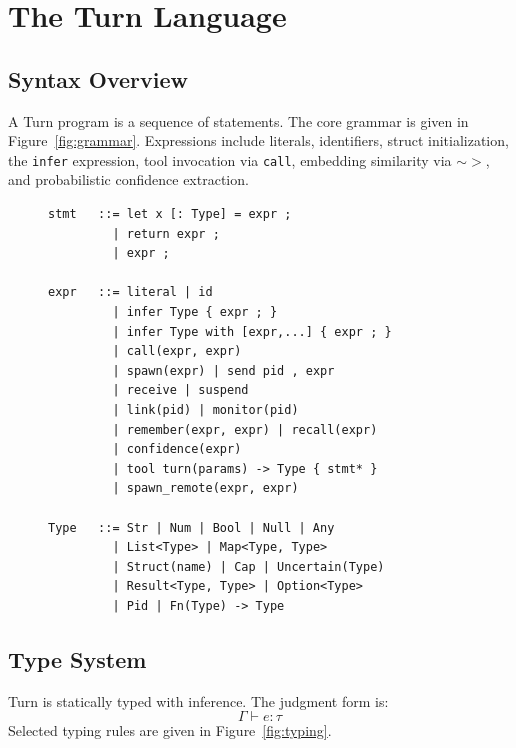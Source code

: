 \documentclass[sigplan,10pt,review,anonymous]{acmart}
\newcommand{\typecheck}[3]{#1 \vdash #2 : #3}
\begin{document}
\section{The Turn Language}

\subsection{Syntax Overview}

A Turn program is a sequence of statements. The core grammar is given in
Figure~\ref{fig:grammar}. Expressions include literals, identifiers,
struct initialization, the \texttt{infer} expression, tool invocation via
\texttt{call}, embedding similarity via $\mathtt{\sim>}$, and probabilistic
confidence extraction.

\begin{figure}[t]
\begin{lstlisting}[caption={Core Turn grammar (excerpt)}, label=fig:grammar]
stmt   ::= let x [: Type] = expr ;
         | return expr ;
         | expr ;

expr   ::= literal | id
         | infer Type { expr ; }
         | infer Type with [expr,...] { expr ; }
         | call(expr, expr)
         | spawn(expr) | send pid , expr
         | receive | suspend
         | link(pid) | monitor(pid)
         | remember(expr, expr) | recall(expr)
         | confidence(expr)
         | tool turn(params) -> Type { stmt* }
         | spawn_remote(expr, expr)

Type   ::= Str | Num | Bool | Null | Any
         | List<Type> | Map<Type, Type>
         | Struct(name) | Cap | Uncertain(Type)
         | Result<Type, Type> | Option<Type>
         | Pid | Fn(Type) -> Type
\end{lstlisting}
\end{figure}

\subsection{Type System}

Turn is statically typed with inference. The judgment form is:
$$\typecheck{\Gamma}{e}{\tau}$$
Selected typing rules are given in Figure~\ref{fig:typing}.
\end{document}
